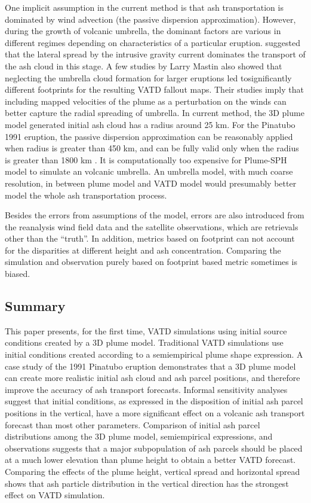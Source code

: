 \documentclass[utf8]{frontiersSCNS} %
\begin{document}
One implicit assumption in the current method is that ash transportation is dominated by wind advection (the passive dispersion approximation). However, during the growth of volcanic umbrella, the dominant factors are various in different regimes \citep{pouget2016interpretation} depending on characteristics of a particular eruption. \citet{webster2020operational} suggested that the lateral spread by the intrusive gravity current dominates the transport of the ash cloud in this stage. A few studies by Larry Mastin \citep{mastin2014modeling,mastin2020comparing} also showed that neglecting the umbrella cloud formation for larger eruptions led tosignificantly different footprints for the resulting VATD fallout maps. Their studies imply that including mapped velocities of the plume as a perturbation on the winds can better capture the radial spreading of umbrella. In current method, the 3D plume model generated initial ash cloud has a radius around 25 km. For the Pinatubo 1991 eruption, the passive dispersion approximation can be reasonably applied when radius is greater than 450 km, and can be fully valid only when the radius is greater than 1800 km \citep{costa2013density}. It is computationally too expensive for Plume-SPH model to simulate an volcanic umbrella. An umbrella model, with much coarse resolution, in between plume model and VATD model would presumably better model the whole ash transportation process.

Besides the errors from assumptions of the model, errors are also introduced from the reanalysis wind field data and the satellite observations, which are retrievals other than the ``truth”. In addition, metrics based on footprint can not account for the disparities at different height and ash concentration. Comparing the simulation and observation purely based on footprint based metric sometimes is biased.

\subsection{Summary}
This paper presents, for the first time, VATD simulations using initial source conditions created by a 3D plume model. Traditional VATD simulations use initial conditions created according to a semiempirical plume shape expression. A case study of the 1991 Pinatubo eruption demonstrates that a 3D plume model can create more realistic initial ash cloud and ash parcel positions, and therefore improve the accuracy of ash transport forecasts. Informal sensitivity analyses suggest that initial conditions, as expressed in the disposition of initial ash parcel positions in the vertical, have a more significant effect on a volcanic ash transport forecast than most other parameters. Comparison of initial ash parcel distributions among the 3D plume model, semiempirical expressions, and observations suggests that a major subpopulation of ash parcels should be placed at a much lower elevation than plume height to obtain a better VATD forecast. Comparing the effects of the plume height, vertical spread and horizontal spread shows that ash particle distribution in the vertical direction has the strongest effect on VATD simulation.
\end{document}
